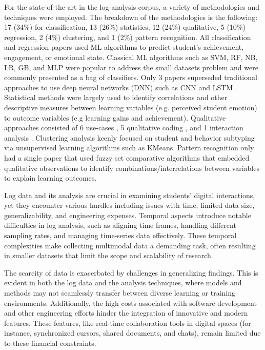 \documentclass[manuscript,screen,review]{acmart}
\begin{document}
For the state-of-the-art in the log-analysis corpus, a variety of methodologies and techniques were employed. The breakdown of the methodologies is the following: 17 (34\%) for classification, 13 (26\%) statistics, 12 (24\%) qualitative, 5 (10\%) regression, 2 (4\%) clustering, and 1 (2\%) pattern recognition. All classification and regression papers used ML algorithms to predict student's achievement, engagement, or emotional state. Classical ML algorithms such as SVM, RF, NB, LR, GB, and MLP \cite{147203129, 483140962, 1019093033, 1576545447, 1598166515, 1886134458, 2273914836, 2456887548, 2936220551, 3339002981, 3408664396, 3796643912, 4277812050, 1581261659, 3783339081, 4278392816} were popular to address the small datasets problem and were commonly presented as a bag of classifiers. Only 3 papers superseded traditional approaches to use deep neural networks (DNN) such as CNN \cite{1637690235} and LSTM \cite{2070224207, 3051560548}. Statistical methods were largely used to identify correlations and other descriptive measures between learning variables (e.g. perceived student emotion) to outcome variables (e.g learning gains and achievement). Qualitative approaches consisted of 6 use-cases \cite{666050348, 818492192, 1296637108}, 5 qualitative coding \cite{2273914836, 2936220551, 3856280479}, and 1 interaction analysis \cite{2273914836}. Clustering analysis keenly focused on student \cite{2273914836} and behavior subtyping \cite{818492192} via unsupervised learning algorithms such as KMeans. Pattern recognition only had a single paper \cite{123412197} that used fuzzy set comparative algorithms that embedded qualitative observations to identify combinations/interrelations between variables to explain learning outcomes.

Log data and its analysis are crucial in examining students' digital interactions, yet they encounter various hurdles including issues with time, limited data size, generalizability, and engineering expenses. Temporal aspects introduce notable difficulties in log analysis, such as aligning time frames, handling different sampling rates, and managing time-series data effectively. These temporal complexities make collecting multimodal data a demanding task, often resulting in smaller datasets that limit the scope and scalability of research.

The scarcity of data is exacerbated by challenges in generalizing findings. This is evident in both the log data and the analysis techniques, where models and methods may not seamlessly transfer between diverse learning or training environments. Additionally, the high costs associated with software development and other engineering efforts hinder the integration of innovative and modern features. These features, like real-time collaboration tools in digital spaces (for instance, synchronized cursors, shared documents, and chats), remain limited due to these financial constraints.
\end{document}
